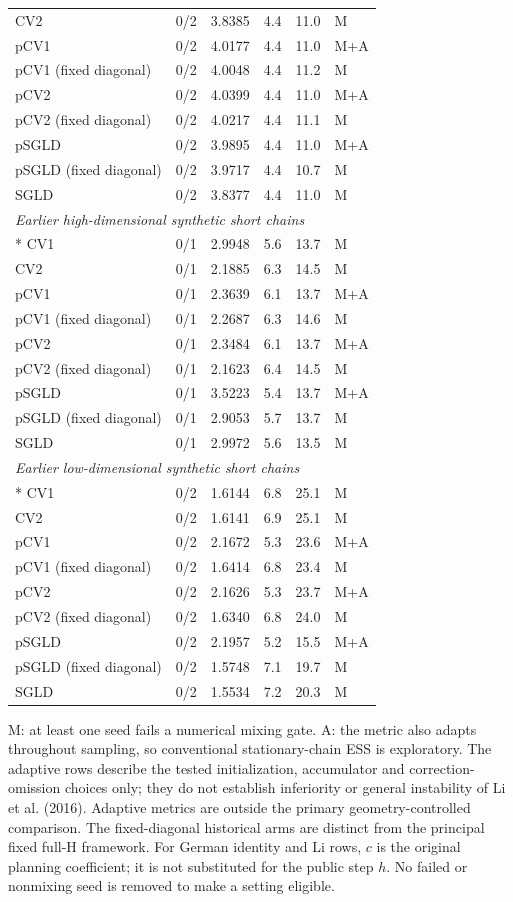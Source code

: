 \begin{longtable}{lrrrrl}
CV2 & 0/2 & 3.8385 & 4.4 & 11.0 & M \\
pCV1 & 0/2 & 4.0177 & 4.4 & 11.0 & M+A \\
pCV1 (fixed diagonal) & 0/2 & 4.0048 & 4.4 & 11.2 & M \\
pCV2 & 0/2 & 4.0399 & 4.4 & 11.0 & M+A \\
pCV2 (fixed diagonal) & 0/2 & 4.0217 & 4.4 & 11.1 & M \\
pSGLD & 0/2 & 3.9895 & 4.4 & 11.0 & M+A \\
pSGLD (fixed diagonal) & 0/2 & 3.9717 & 4.4 & 10.7 & M \\
SGLD & 0/2 & 3.8377 & 4.4 & 11.0 & M \\
\multicolumn{6}{l}{\textit{Earlier high-dimensional synthetic short chains}} \\*
CV1 & 0/1 & 2.9948 & 5.6 & 13.7 & M \\
CV2 & 0/1 & 2.1885 & 6.3 & 14.5 & M \\
pCV1 & 0/1 & 2.3639 & 6.1 & 13.7 & M+A \\
pCV1 (fixed diagonal) & 0/1 & 2.2687 & 6.3 & 14.6 & M \\
pCV2 & 0/1 & 2.3484 & 6.1 & 13.7 & M+A \\
pCV2 (fixed diagonal) & 0/1 & 2.1623 & 6.4 & 14.5 & M \\
pSGLD & 0/1 & 3.5223 & 5.4 & 13.7 & M+A \\
pSGLD (fixed diagonal) & 0/1 & 2.9053 & 5.7 & 13.7 & M \\
SGLD & 0/1 & 2.9972 & 5.6 & 13.5 & M \\
\multicolumn{6}{l}{\textit{Earlier low-dimensional synthetic short chains}} \\*
CV1 & 0/2 & 1.6144 & 6.8 & 25.1 & M \\
CV2 & 0/2 & 1.6141 & 6.9 & 25.1 & M \\
pCV1 & 0/2 & 2.1672 & 5.3 & 23.6 & M+A \\
pCV1 (fixed diagonal) & 0/2 & 1.6414 & 6.8 & 23.4 & M \\
pCV2 & 0/2 & 2.1626 & 5.3 & 23.7 & M+A \\
pCV2 (fixed diagonal) & 0/2 & 1.6340 & 6.8 & 24.0 & M \\
pSGLD & 0/2 & 2.1957 & 5.2 & 15.5 & M+A \\
pSGLD (fixed diagonal) & 0/2 & 1.5748 & 7.1 & 19.7 & M \\
SGLD & 0/2 & 1.5534 & 7.2 & 20.3 & M \\
\end{longtable}
\endgroup
\noindent\footnotesize M: at least one seed fails a numerical mixing gate. A: the metric also adapts throughout sampling, so conventional stationary-chain ESS is exploratory. The adaptive rows describe the tested initialization, accumulator and correction-omission choices only; they do not establish inferiority or general instability of Li et al. (2016). Adaptive metrics are outside the primary geometry-controlled comparison. The fixed-diagonal historical arms are distinct from the principal fixed full-H framework. For German identity and Li rows, $c$ is the original planning coefficient; it is not substituted for the public step $h$. No failed or nonmixing seed is removed to make a setting eligible.\normalsize
